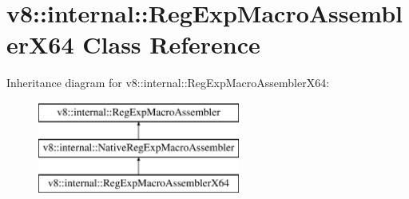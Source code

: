 \hypertarget{classv8_1_1internal_1_1_reg_exp_macro_assembler_x64}{}\section{v8\+:\+:internal\+:\+:Reg\+Exp\+Macro\+Assembler\+X64 Class Reference}
\label{classv8_1_1internal_1_1_reg_exp_macro_assembler_x64}
Inheritance diagram for v8\+:\+:internal\+:\+:Reg\+Exp\+Macro\+Assembler\+X64\+:\begin{figure}[H]
\begin{center}
\leavevmode
\includegraphics[height=3.000000cm]{classv8_1_1internal_1_1_reg_exp_macro_assembler_x64}
\end{center}
\end{figure}
